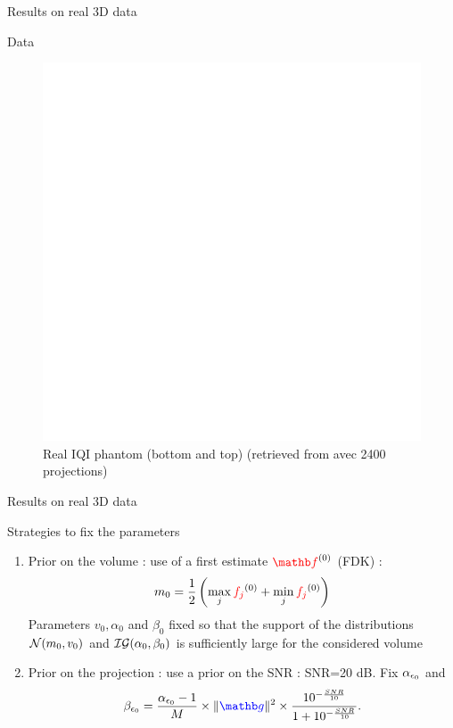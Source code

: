 \documentclass[latex]{beamer}
\def\beq{\[} \def\eeq{\]}
\begin{document}
\begin{frame}{Results on real 3D data}
\begin{block}{Data}
\begin{enumerate}
\begin{figure}
\begin{minipage}[htb]{0.46\linewidth}
\includegraphics[scale=0.25]{volume_FDK2400projHaut.png}
\end{minipage}
\caption*{Real IQI phantom (bottom and top) (retrieved from avec 2400 projections)}
\label{fig:Real IQI data}
\end{figure}
\end{enumerate}
\end{block}
\end{frame}

\begin{frame}{Results on real 3D data}
\begin{block}{Strategies to fix the parameters}
\begin{enumerate}
\item Prior on the volume : use of a first estimate $\rfb^{(0)}$ (FDK) :
\beq
m_{0}=\frac{1}{2}\left(\max_{j}{\red{f_{j}}^{(0)}}+\min_{j}{\red{f_{j}}^{(0)}}\right)
\eeq
Parameters $v_0, \alpha_0$ and $\beta_0$ fixed so that the support of the distributions ${\mathcal{N}}(m_0, v_0)$ and ${\mathcal{I}}{\mathcal{G}}(\alpha_0, \beta_0)$ is sufficiently large for the considered volume
\item Prior on the projection : use a prior on the SNR : SNR=20 dB. Fix $\alpha_{\epsilon_0}$ and
\beq
\betaez=\frac{\alphaez-1}{M}\times\|\bgb\|^{2}\times \frac{10^{-\frac{SNR}{10}}}{1+10^{-\frac{SNR}{10}}}.
\label{eq:betaez}
\eeq
\end{enumerate}
\end{block}
\end{frame}
\end{document}
